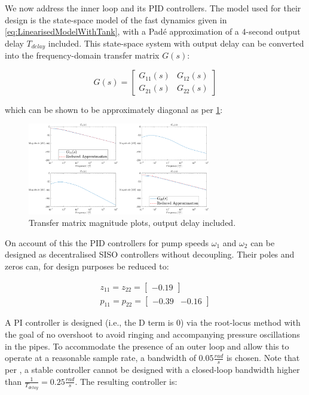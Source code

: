 We now address the inner loop and its PID controllers. The model used for their design is the state-space model of the fast dynamics given in \cref{eq:LinearisedModelWithTank}, with a Padé approximation of a $4$-second output delay $T_{delay}$ included. This state-space system with output delay can be converted into the frequency-domain transfer matrix $G(s)$:

\begin{equation}\label{eq:TransferMatrix}
	G(s) = \begin{bmatrix} G_{11}(s) & G_{12}(s) \\ G_{21}(s) & G_{22}(s)\end{bmatrix}
\end{equation}

which can be shown to be approximately diagonal as per \cref{fig:BodeMagDelayPlot}:

\begin{figure}[h!]
 	\centering
 	\includegraphics[width=\linewidth,height=4cm]{Graphics/PumpMagPlot.pdf}
 	\caption{Transfer matrix magnitude plots, output delay included.}
 	\label{fig:BodeMagDelayPlot}
\end{figure}

On account of this the PID controllers for pump speeds $\omega_1$ and $\omega_2$ can be designed as decentralised SISO controllers without decoupling. Their poles and zeros can, for design purposes be reduced to:

\begin{equation}\label{eq:PumpTFSimple}
	\begin{gathered}
		z_{11} = z_{22} = \begin{bmatrix}-0.19\end{bmatrix} \\
		p_{11} = p_{22} = \begin{bmatrix}-0.39 & -0.16 \end{bmatrix}
	\end{gathered}
\end{equation}

A PI controller is designed (i.e., the D term is $0$) via the root-locus method with the goal of no overshoot to avoid ringing and accompanying pressure oscillations in the pipes. To accommodate the presence of an outer loop and allow this to operate at a reasonable sample rate, a bandwidth of $0.05 \frac{\si{rad}}{\si{s}}$ is chosen. Note that per \cite{Skogestad2005}, a stable controller cannot be designed with a closed-loop bandwidth higher than $\frac{1}{T_{delay}} = 0.25 \frac{\si{rad}}{\si{s}}$. The resulting controller is:

